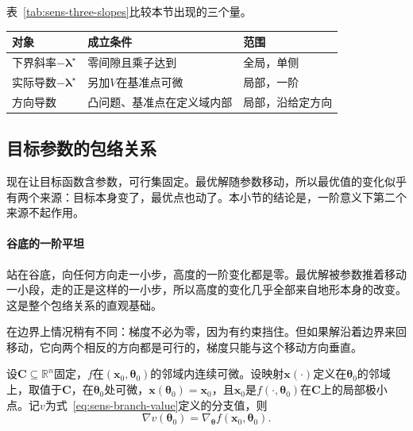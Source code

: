 表~\ref{tab:sens-three-slopes}比较本节出现的三个量。

\begin{BookInlineTable}
 \centering
 \begin{tabular}{lll}
  \toprule
  对象 & 成立条件 & 范围\\
  \midrule
  下界斜率$-\bm{\lambda}^\star$ & 零间隙且乘子达到 & 全局，单侧\\
  实际导数$-\bm{\lambda}^\star$ & 另加$V$在基准点可微 & 局部，一阶\\
  方向导数 & 凸问题、基准点在定义域内部 & 局部，沿给定方向\\
  \bottomrule
 \end{tabular}
 \caption{约束右端扰动下的三个量。下界斜率来自任何一组最优乘子，实际导数要求$V$可微，方向导数要在全体最优乘子上取最大值。}
 \label{tab:sens-three-slopes}
\end{BookInlineTable}

\subsection{目标参数的包络关系}
\label{sec:sens-envelope}

现在让目标函数含参数，可行集固定。最优解随参数移动，所以最优值的变化似乎有两个来源：目标本身变了，最优点也动了。本小节的结论是，一阶意义下第二个来源不起作用。

\paragraph{谷底的一阶平坦}
站在谷底，向任何方向走一小步，高度的一阶变化都是零。最优解被参数推着移动一小段，走的正是这样的一小步，所以高度的变化几乎全部来自地形本身的改变。这是整个包络关系的直观基础。

在边界上情况稍有不同：梯度不必为零，因为有约束挡住。但如果解沿着边界来回移动，它向两个相反的方向都是可行的，梯度只能与这个移动方向垂直。

\begin{theorem}[包络关系]
\label{thm:sens-envelope}
设$\bm{C}\subseteq\mathbb{R}^n$固定，$f$在$(\bm{x}_0,\bm{\theta}_0)$的邻域内连续可微。设映射$\bm{x}(\cdot)$定义在$\bm{\theta}_0$的邻域上，取值于$\bm{C}$，在$\bm{\theta}_0$处可微，$\bm{x}(\bm{\theta}_0)=\bm{x}_0$，且$\bm{x}_0$是$f(\cdot,\bm{\theta}_0)$在$\bm{C}$上的局部极小点。记$v$为式~\eqref{eq:sens-branch-value}定义的分支值，则
\begin{equation}
 \nabla v(\bm{\theta}_0)=\nabla_{\bm{\theta}}f(\bm{x}_0,\bm{\theta}_0).
 \label{eq:sens-envelope}
\end{equation}
\end{theorem}

